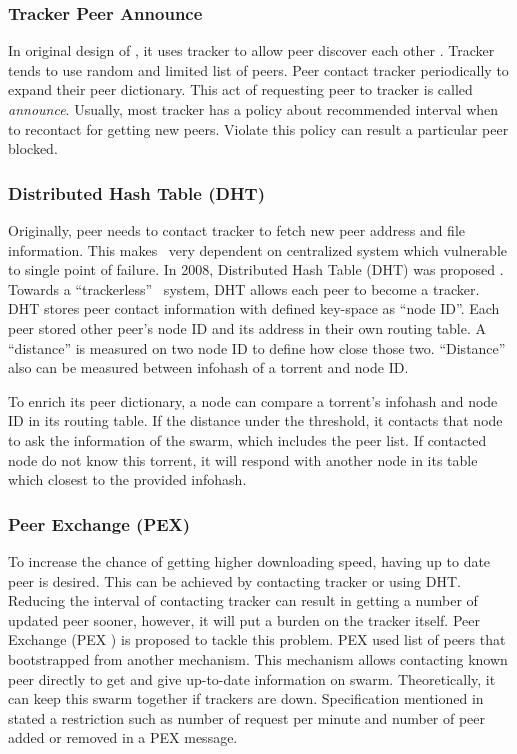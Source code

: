 \subsubsection{Tracker Peer Announce}
In original design of \bt, it uses tracker to allow peer discover each other \cite{2003:bittorrent:cohen}. Tracker tends to use random and limited list of peers. Peer contact tracker periodically to expand their peer dictionary. This act of requesting peer to tracker is called \textit{announce}.	Usually, most tracker has a policy about recommended interval when to recontact for getting new peers. Violate this policy can result a particular peer blocked.	

\subsubsection{Distributed Hash Table (DHT)}
Originally, peer needs to contact tracker to fetch new peer address and file information. This makes \bt~very dependent on centralized system which vulnerable to single point of failure. In 2008, Distributed Hash Table (DHT) was proposed \cite{2008:dht:loewenstern}. Towards a ``trackerless'' \bt~system, DHT allows each peer to become a tracker. DHT stores peer contact information with defined key-space as ``node ID''. Each peer stored other peer's node ID and its address in their own routing table. A ``distance'' is measured on two node ID to define how close those two. ``Distance'' also can be measured between infohash of a torrent and node ID.

To enrich its peer dictionary, a node can compare a torrent's infohash and node ID in its routing table. If the distance under the threshold, it contacts that node to ask the information of the swarm, which includes the peer list. If contacted node do not know this torrent, it will respond with another node in its table which closest to the provided infohash. 

\subsubsection{Peer Exchange (PEX)}
To increase the chance of getting higher downloading speed, having up to date peer is desired. This can be achieved by contacting tracker or using DHT. Reducing the interval of contacting tracker can result in getting a number of updated peer sooner, however, it will put a burden on the tracker itself. Peer Exchange (PEX )\cite{2015:PEX:the8472} is proposed to tackle this problem. PEX used list of peers that bootstrapped from another mechanism. This mechanism allows contacting known peer directly to get and give up-to-date information on swarm. Theoretically, it can keep this swarm together if trackers are down. Specification mentioned in \cite{2015:PEX:the8472} stated a restriction such as number of request per minute and number of peer added or removed in a PEX message.

